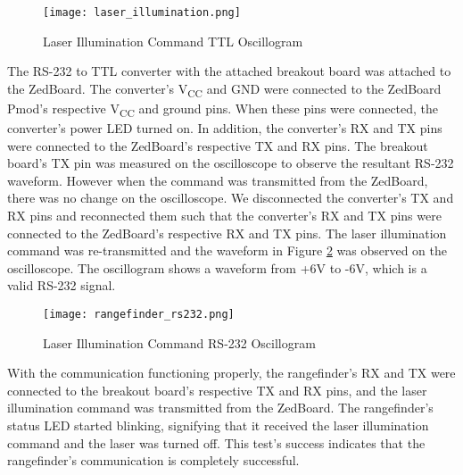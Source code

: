 \begin{figure}[H]
	\centerline{\texttt{[image: laser\_illumination.png]}}
	\caption{Laser Illumination Command TTL Oscillogram}
	\label{laser_illumination}
\end{figure}

The RS-232 to TTL converter with the attached breakout board was attached to the ZedBoard. The converter's V\textsubscript{CC} and GND were connected to the ZedBoard Pmod's respective V\textsubscript{CC} and ground pins. When these pins were connected, the converter's power LED turned on. In addition, the converter's RX and TX pins were connected to the ZedBoard's respective TX and RX pins. The breakout board's TX pin was measured on the oscilloscope to observe the resultant RS-232 waveform. However when the command was transmitted from the ZedBoard, there was no change on the oscilloscope. We disconnected the converter's TX and RX pins and reconnected them such that the converter's RX and TX pins were connected to the ZedBoard's respective RX and TX pins. The laser illumination command was re-transmitted and the waveform in Figure \ref{rangefinder_rs232} was observed on the oscilloscope. The oscillogram shows a waveform from +6V to -6V, which is a valid RS-232 signal.

\begin{figure}[H]
	\centerline{\texttt{[image: rangefinder\_rs232.png]}}
	\caption{Laser Illumination Command RS-232 Oscillogram}
	\label{rangefinder_rs232}
\end{figure}

With the communication functioning properly, the rangefinder's RX and TX were connected to the breakout board's respective TX and RX pins, and the laser illumination command was transmitted from the ZedBoard. The rangefinder's status LED started blinking, signifying that it received the laser illumination command and the laser was turned off. This test's success indicates that the rangefinder's communication is completely successful.

